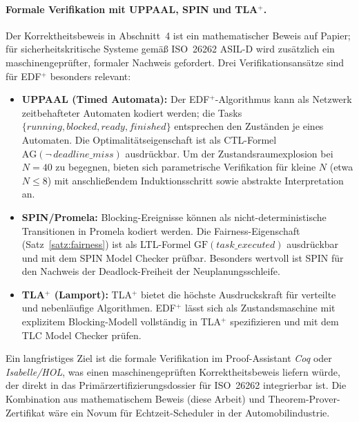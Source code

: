 ﻿\documentclass[a4paper,12pt]{article}
\theoremstyle{definition}
\begin{document}
	\paragraph{Formale Verifikation mit UPPAAL, SPIN und TLA$^+$.}
	Der Korrektheitsbeweis in Abschnitt~4 ist ein mathematischer Beweis auf Papier; für
	sicherheitskritische Systeme gemä\ss{} ISO~26262 ASIL-D wird zusätzlich ein
	maschinengeprüfter, formaler Nachweis gefordert. Drei Verifikationsansätze sind
	für EDF$^+$ besonders relevant:
	\begin{itemize}
		\item \textbf{UPPAAL (Timed Automata):} Der EDF$^+$-Algorithmus kann als Netzwerk
		      zeitbehafteter Automaten kodiert werden; die Tasks
		      $\{running, blocked, ready, finished\}$ entsprechen den Zuständen je eines
		      Automaten. Die Optimalitätseigenschaft ist als CTL-Formel
		      $\mathrm{AG}(\neg\, \textit{deadline\_miss})$ ausdrückbar.
		      Um der Zustandsraumexplosion bei $N = 40$ zu begegnen, bieten sich
		      parametrische Verifikation für kleine $N$ (etwa $N \le 8$) mit
		      anschlie\ss{}endem Induktionsschritt sowie abstrakte Interpretation an.
		\item \textbf{SPIN/Promela:} Blocking-Ereignisse können als nicht-deterministische
		      Transitionen in Promela kodiert werden. Die Fairness-Eigenschaft
		      (Satz~\ref{satz:fairness}) ist als LTL-Formel
		      $\mathrm{GF}(\textit{task\_executed})$ ausdrückbar und mit dem SPIN Model
		      Checker prüfbar. Besonders wertvoll ist SPIN für den Nachweis der
		      Deadlock-Freiheit der Neuplanungsschleife.
		\item \textbf{TLA$^+$ (Lamport):} TLA$^+$ bietet die höchste Ausdruckskraft für
		      verteilte und nebenläufige Algorithmen. EDF$^+$ lässt sich als
		      Zustandsmaschine mit explizitem Blocking-Modell vollständig in TLA$^+$
		      spezifizieren und mit dem TLC Model Checker prüfen.
	\end{itemize}
	Ein langfristiges Ziel ist die formale Verifikation im Proof-Assistant \emph{Coq} oder
	\emph{Isabelle/HOL}, was einen maschinengeprüften Korrektheitsbeweis liefern würde,
	der direkt in das Primärzertifizierungsdossier für ISO~26262 integrierbar ist.
	Die Kombination aus mathematischem Beweis (diese Arbeit) und Theorem-Prover-Zertifikat
	wäre ein Novum für Echtzeit-Scheduler in der Automobilindustrie.
\end{document}
